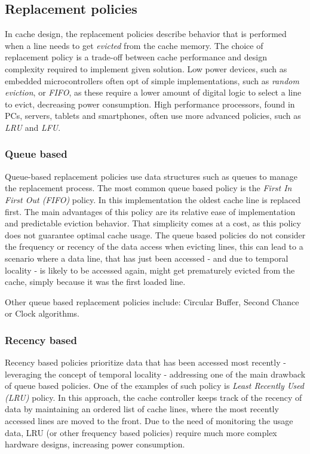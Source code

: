 %
\subsection{Replacement policies}
In cache design, the replacement policies describe behavior that is performed when a line needs to get \textit{evicted} from the cache memory.
The choice of replacement policy is a trade-off between cache performance and design complexity required to implement given solution. Low power
devices, such as embedded microcontrollers often opt of simple implementations, such as \textit{random eviction}, or \textit{FIFO}, as these require %
a lower amount of digital logic to select a line to evict, decreasing power consumption. High performance processors, found in PCs, servers, tablets and smartphones,
often use more advanced policies, such as \textit{LRU} and \textit{LFU}.

\subsubsection{Queue based}
Queue-based replacement policies use data structures such as queues to manage the replacement process. The most common queue based policy is the
\textit{First In First Out (FIFO)} policy. In this implementation the oldest cache line is replaced first. The main advantages of this policy are  %
its relative ease of implementation and predictable eviction behavior. That simplicity comes at a cost, as this policy does not guarantee optimal cache usage. The queue
based policies do not consider the frequency or recency of the data access when evicting lines, this can lead to a scenario where a data line, that has just been accessed - and due to
temporal locality - is likely to be accessed again, might get prematurely evicted from the cache, simply because it was the first loaded line.

\vspace{10px}\noindent Other queue based replacement policies include: Circular Buffer, Second Chance or Clock algorithms. %

\subsubsection{Recency based}
Recency based policies prioritize data that has been accessed most recently - leveraging the concept of temporal locality - addressing one of
the main drawback of queue based policies. One of the examples of such policy is \textit{Least Recently Used (LRU)} policy. In this approach, the cache controller
keeps track of the recency of data by maintaining an ordered list of cache lines, where the most recently accessed lines are moved to the front. Due to the need of monitoring
the usage data, LRU (or other frequency based policies) require much more complex hardware designs, increasing power consumption. 

